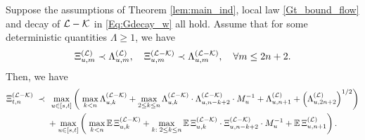 \begin{lemma}\label{lem:STOeq_Qt} 
Suppose the assumptions of 
 Theorem \ref{lem:main_ind}, local law \eqref{Gt_bound_flow} and decay of $\cal L-\cal K$ in \eqref{Eq:Gdecay_w} all hold. 
Assume that for some  deterministic quantities $\Lambda\geq1$, we have 
 \begin{align}
  \Xi^{({\cal L})}_{u, { m }}\prec \Lambda^{({\cal L})}_{u, { m }},\quad  \Xi^{({\cal L-\cal K})}_{u, { m}}\prec \Lambda^{({\cal L-\cal K})}_{u, {m}},\quad \forall m\le 2n+2. \label{STOeq_Qt_assume}
 \end{align}
Then, we have 
\begin{align}\label{am;asoi222}
 \Xi^{({\cal L-\cal K})}_{t,n}
 \;\prec\;  &\;   \max_{u\in [s,t]}
  \left(\; \max_{k<n }\Lambda^{({\cal L-\cal K})}_{u,k}+\max_{2\le k\le n }\Lambda^{({\cal L-\cal K})}_{u,k}\cdot \Lambda^{({\cal L-\cal K})}_{u,n-k+2}\cdot M_{u}^{-1}+\Lambda^{({\cal L})}_{u,n+1}+\left(\Lambda^{(\cal L)}_{u,2n+2}\right)^{1/2}\right)\\
  &+ \max_{u\in[s,t]}\left(\; \max_{k<n }\mathbb E \,\Xi^{({\cal L-\cal K})}_{u,k}+\max_{k:\;2\le k\le n }\mathbb E \, \Xi^{({\cal L-\cal K})}_{u,k}\cdot \Xi^{({\cal L-\cal K})}_{u,n-k+2}\cdot M_u^{-1}+\mathbb E \,\Xi^{({\cal L})}_{u,n+1}\right).\nonumber
\end{align}
\end{lemma}

